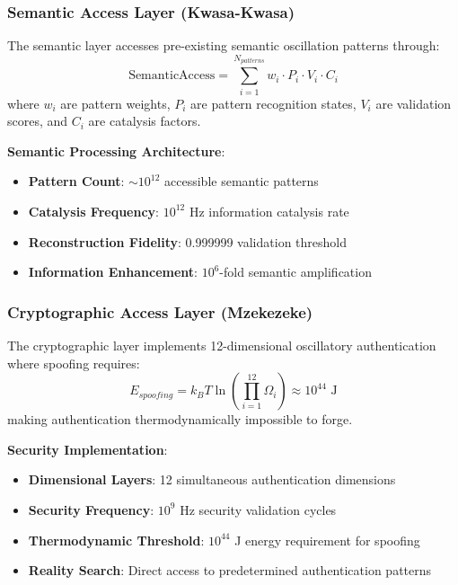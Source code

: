 ﻿\documentclass[11pt,a4paper]{article}
\begin{document}
\subsubsection{Semantic Access Layer (Kwasa-Kwasa)}

\begin{definition}
The semantic layer accesses pre-existing semantic oscillation patterns through:
\begin{equation}
\text{SemanticAccess} = \sum_{i=1}^{N_{patterns}} w_i \cdot P_i \cdot V_i \cdot C_i
\end{equation}
where $w_i$ are pattern weights, $P_i$ are pattern recognition states, $V_i$ are validation scores, and $C_i$ are catalysis factors.
\end{definition}

\textbf{Semantic Processing Architecture}:
\begin{itemize}
\item \textbf{Pattern Count}: $\sim 10^{12}$ accessible semantic patterns
\item \textbf{Catalysis Frequency}: $10^{12}$ Hz information catalysis rate
\item \textbf{Reconstruction Fidelity}: 0.999999 validation threshold
\item \textbf{Information Enhancement}: $10^6$-fold semantic amplification
\end{itemize}

\subsubsection{Cryptographic Access Layer (Mzekezeke)}

\begin{definition}
The cryptographic layer implements 12-dimensional oscillatory authentication where spoofing requires:
\begin{equation}
E_{spoofing} = k_B T \ln\left(\prod_{i=1}^{12} \Omega_i\right) \approx 10^{44} \text{ J}
\end{equation}
making authentication thermodynamically impossible to forge.
\end{definition}

\textbf{Security Implementation}:
\begin{itemize}
\item \textbf{Dimensional Layers}: 12 simultaneous authentication dimensions
\item \textbf{Security Frequency}: $10^9$ Hz security validation cycles
\item \textbf{Thermodynamic Threshold}: $10^{44}$ J energy requirement for spoofing
\item \textbf{Reality Search}: Direct access to predetermined authentication patterns
\end{itemize}
\end{document}
